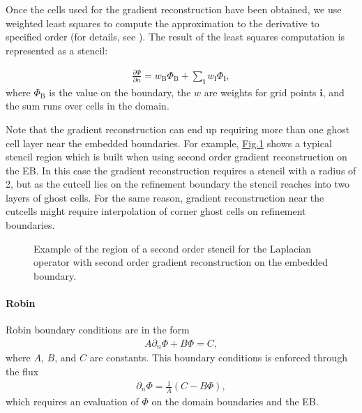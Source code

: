 \documentclass[letterpaper,10pt,english]{sphinxmanual}
\let\sphinxpxdimen\pdfpxdimen\else\newdimen\sphinxpxdimen
\begin{document}
Once the cells used for the gradient reconstruction have been obtained, we use weighted least squares to compute the approximation to the derivative to specified order (for details, see {\hyperref[\detokenize{Utilities/LeastSquares:chap-leastsquares}]{}}).
The result of the least squares computation is represented as a stencil:

\label{\detokenize{Source/LinearSolvers:eq-dirichletelliptic}}\begin{equation*}
\begin{split}\frac{\partial\Phi}{\partial n} = w_{\textrm{B}}\Phi_{\textrm{B}} + \sum_{\mathbf{i}} w_{\mathbf{i}}\Phi_{\mathbf{i}},\end{split}
\end{equation*}
where \(\Phi_{\textrm{B}}\) is the value on the boundary, the \(w\) are weights for grid points \(\mathbf{i}\), and the sum runs over cells in the domain.

Note that the gradient reconstruction can end up requiring more than one ghost cell layer near the embedded boundaries.
For example, \hyperref[\detokenize{Source/LinearSolvers:fig-stencilregion}]{Fig.\@ \ref{\detokenize{Source/LinearSolvers:fig-stencilregion}}} shows a typical stencil region which is built when using second order gradient reconstruction on the EB.
In this case the gradient reconstruction requires a stencil with a radius of 2, but as the cut\sphinxhyphen{}cell lies on the refinement boundary the stencil reaches into two layers of ghost cells.
For the same reason, gradient reconstruction near the cut\sphinxhyphen{}cells might require interpolation of corner ghost cells on refinement boundaries.

\begin{figure}[htb]
\centering
\capstart

\noindent\sphinxincludegraphics[width=360\sphinxpxdimen]{{StencilRegion}.png}
\caption{Example of the region of a second order stencil for the Laplacian operator with second order gradient reconstruction on the embedded boundary.}\label{\detokenize{Source/LinearSolvers:id3}}\label{\detokenize{Source/LinearSolvers:fig-stencilregion}}\end{figure}


\paragraph{Robin}
\label{\detokenize{Source/LinearSolvers:robin}}
Robin boundary conditions are in the form
\begin{equation*}
\begin{split}A\partial_n\Phi + B\Phi = C,\end{split}
\end{equation*}
where \(A\), \(B\), and \(C\) are constants.
This boundary conditions is enforced through the flux
\begin{equation*}
\begin{split}\partial_n\Phi = \frac{1}{A}\left(C - B\Phi\right),\end{split}
\end{equation*}
which requires an evaluation of \(\Phi\) on the domain boundaries and the EB.
\end{document}
